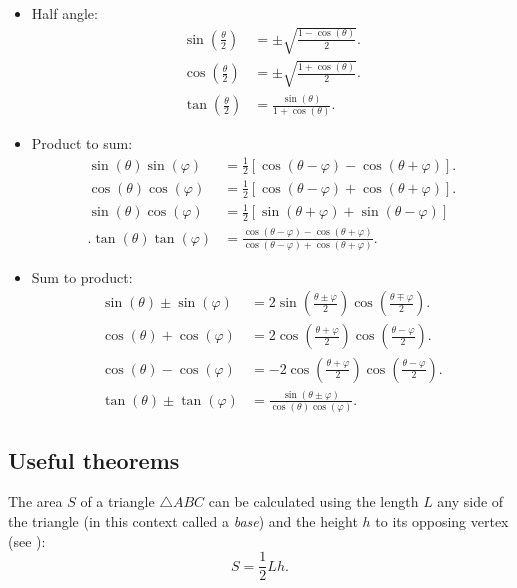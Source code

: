 \begin{itemize}
	\item Half angle:
		\begin{align}
			\sin\left( \frac{\theta}{2} \right) &= \pm\sqrt{\frac{1-\cos(\theta)}{2}}.\\
			\cos\left( \frac{\theta}{2} \right) &= \pm\sqrt{\frac{1+\cos(\theta)}{2}}.\\
			\tan\left( \frac{\theta}{2} \right) &= \frac{\sin(\theta)}{1+\cos(\theta)}.
		\end{align}
	
	\item Product to sum:
		\begin{align}
			\sin(\theta)\sin(\varphi) &= \frac{1}{2}\left[ \cos(\theta-\varphi)-\cos(\theta+\varphi) \right].\\
			\cos(\theta)\cos(\varphi) &= \frac{1}{2}\left[ \cos(\theta-\varphi)+\cos(\theta+\varphi) \right].\\
			\sin(\theta)\cos(\varphi) &= \frac{1}{2}\left[ \sin(\theta+\varphi) + \sin(\theta-\varphi) \right]\\.
			\tan(\theta)\tan(\varphi) &= \frac{\cos(\theta-\varphi)-\cos(\theta+\varphi)}{\cos(\theta-\varphi)+\cos(\theta+\varphi)}.
		\end{align}

	\item Sum to product:
		\begin{align}
			\sin(\theta)\pm\sin(\varphi) &= 2\sin\left( \frac{\theta\pm\varphi}{2} \right)\cos\left( \frac{\theta\mp\varphi}{2} \right).\\
			\cos(\theta)+\cos(\varphi) &= 2\cos\left( \frac{\theta+\varphi}{2} \right)\cos\left( \frac{\theta-\varphi}{2} \right).\\
			\cos(\theta)-\cos(\varphi) &= -2\cos\left( \frac{\theta+\varphi}{2} \right)\cos\left( \frac{\theta-\varphi}{2} \right).\\
			\tan(\theta)\pm\tan(\varphi) &= \frac{\sin(\theta\pm\varphi)}{\cos(\theta)\cos(\varphi)}.
		\end{align}
\end{itemize}

\subsection{Useful theorems}
The area $S$ of a triangle $\triangle ABC$ can be calculated using the length $L$ any side of the triangle (in this context called a \emph{base}) and the height $h$ to its opposing vertex (see ):
\begin{equation}
	S = \frac{1}{2}Lh.
	\label{eq:area of a triangle}
\end{equation}

